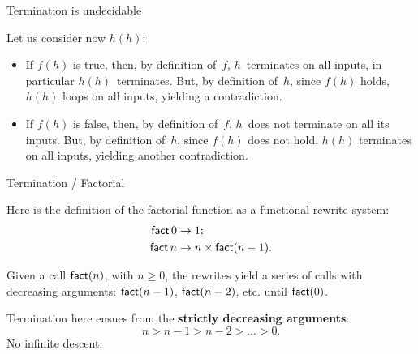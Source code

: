 %
\begin{frame}{Termination is undecidable}

  Let us consider now \(h(h)\):
  \begin{itemize}

    \item If \(f(h)\) is true, then, by definition of~\(f\),
      \(h\)~terminates on all inputs, in particular
      \(h(h)\)~terminates. But, by definition of~\(h\), since \(f(h)\)
      holds, \(h(h)\) loops on all inputs, yielding a contradiction.

    \item If \(f(h)\) is false, then, by definition of~\(f\),
      \(h\)~does not terminate on all its inputs. But, by definition
      of~\(h\), since \(f(h)\) does not hold, \(h(h)\) terminates on
      all inputs, yielding another contradiction.

  \end{itemize}

\end{frame}

%
\begin{frame}{Termination / Factorial}

  Here is the definition of the factorial function as a functional
  rewrite system:
  \begin{align*}
    \textsf{fact} \, 0 & \rightarrow 1;\\
    \textsf{fact} \, n & \rightarrow n \times \textsf{fact}(n-1).
  \end{align*}

  \medskip

  Given a call \(\textsf{fact}(n)\), with \(n \geqslant 0\), the rewrites
  yield a series of calls with decreasing arguments:
  \(\textsf{fact}(n-1)\), \(\textsf{fact}(n-2)\), etc. until
  \(\textsf{fact}(0)\).

  \bigskip

  Termination here ensues from the \textbf{strictly decreasing
    arguments}:
  \begin{equation*}
    n > n-1 > n-2 > \dots > 0.
  \end{equation*}
  No infinite descent.

\end{frame}

